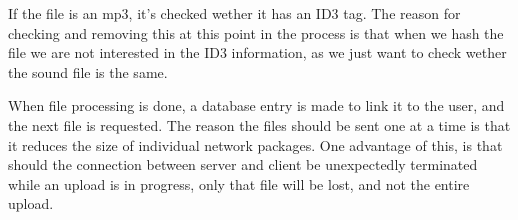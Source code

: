 If the file is an mp3, it's checked wether it has an ID3 tag\cite{ONeill10}. The reason for checking and removing this at this point in
the process is that when we hash the file we are not interested in the ID3 information, as we just want to check wether the sound file is
the same.

When file processing is done, a database entry is made to link it to the user, and the next file is requested. The reason the files
should be sent one at a time is that it reduces the size of individual network packages. One advantage of this, is that should the
connection between server and client be unexpectedly terminated while an upload is in progress, only that file will be lost, and not the
entire upload.